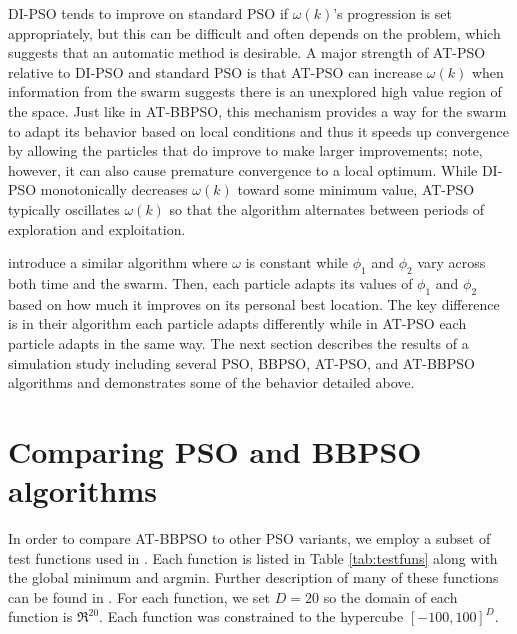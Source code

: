 \documentclass[cmbright]{staauth}
\begin{document}
DI-PSO tends to improve on standard PSO if $\omega(k)$'s progression is set appropriately, but this can be difficult and often depends on the problem, which suggests that an automatic method is desirable. A major strength of AT-PSO relative to DI-PSO and standard PSO is that AT-PSO can increase $\omega(k)$ when information from the swarm suggests there is an unexplored high value region of the space. Just like in AT-BBPSO, this mechanism provides a way for the swarm to adapt its behavior based on local conditions and thus it speeds up convergence by allowing the particles that do improve to make larger improvements; note, however, it can also cause premature convergence to a local optimum. While DI-PSO monotonically decreases $\omega(k)$ toward some minimum value, AT-PSO typically oscillates $\omega(k)$ so that the algorithm alternates between periods of exploration and exploitation.

\cite{zhang2003adaptive} introduce a similar algorithm where $\omega$ is constant while $\phi_1$ and $\phi_2$ vary across both time and the swarm. Then, each particle adapts its values of $\phi_1$ and $\phi_2$ based on how much it improves on its personal best location. The key difference is in their algorithm each particle adapts differently while in AT-PSO each particle adapts in the same way. The next section describes the results of a simulation study including several PSO, BBPSO, AT-PSO, and AT-BBPSO algorithms and demonstrates some of the behavior detailed above. 


\section{Comparing PSO and BBPSO algorithms}\label{sec:psocompare}

In order to compare AT-BBPSO to other PSO variants, we employ a subset of test functions used in \cite{hsieh2010modified}. Each function is listed in Table \ref{tab:testfuns} along with the global minimum and argmin. Further description of many of these functions can be found in \cite{clerc2010particle}. For each function, we set $D=20$ so the domain of each function is $\Re^{20}$. Each function was constrained to the hypercube $[-100, 100]^D$.
\end{document}
